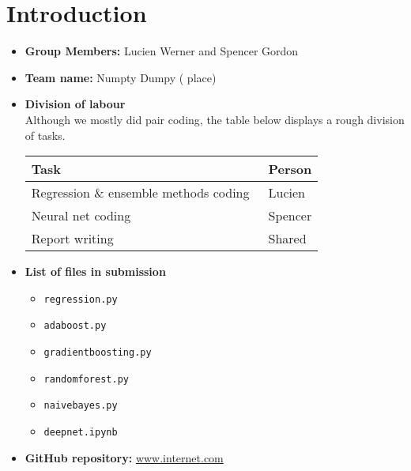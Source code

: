 \section{Introduction}
\medskip
\begin{itemize}
	
	\item \textbf{Group Members:} Lucien Werner and Spencer Gordon
	
	\item \textbf{Team name:} Numpty Dumpy ( place)
	
	\item \textbf{Division of labour} \\
	Although we mostly did pair coding, the table below displays a rough division of tasks. 
	\begin{table}[h]
		\centering
		\begin{tabular}{l|l}
			Task                                   & Person   \\ 
			\hline
			Regression \& ensemble methods coding~ & Lucien  \\
			Neural net coding                      & Spencer  \\
			Report writing                         & Shared  
		\end{tabular}
	\end{table}
	
	\item \textbf{List of files in submission}
	\begin{itemize}
		\item \texttt{regression.py}	
		\item \texttt{adaboost.py}	
		\item \texttt{gradientboosting.py}	
		\item \texttt{randomforest.py}	
		\item \texttt{naivebayes.py}
		\item \texttt{deepnet.ipynb}	
		
		
		
		
	\end{itemize}
\item \textbf{GitHub repository:} \url{www.internet.com}
\end{itemize}



